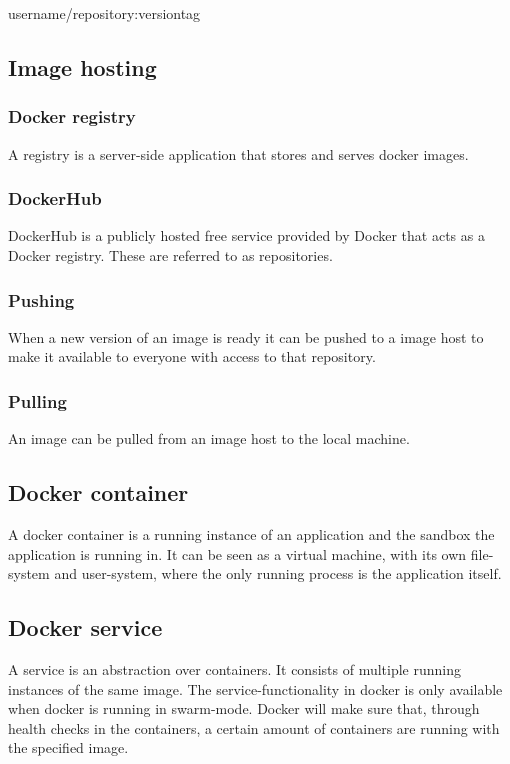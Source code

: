 username/repository:versiontag

\subsection{Image hosting}

\subsubsection{Docker registry}
A registry is a server-side application that stores and serves docker images.

\subsubsection{DockerHub}
DockerHub is a publicly hosted free service provided by Docker that acts as a Docker registry. These are referred to as repositories.

\subsubsection{Pushing}

When a new version of an image is ready it can be pushed to a image host to make it available to everyone with access to that repository.

\subsubsection{Pulling}

An image can be pulled from an image host to the local machine.

\subsection{Docker container}
A docker container is a running instance of an application and the sandbox the application is running in. It can be seen as a virtual machine, with its own file-system and user-system, where the only running process is the application itself.

\subsection{Docker service}
A service is an abstraction over containers. It consists of multiple running instances of the same image. The service-functionality in docker is only available when docker is running in swarm-mode. Docker will make sure that, through health checks in the containers, a certain amount of containers are running with the specified image.


